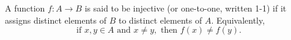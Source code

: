 A function $f: A \to B$ is said to be injective (or one-to-one, written 1-1) if it assigns distinct elements of $B$ to distinct elements of $A$. Equivalently,
$$\text{if } x, y \in A \text{ and } x \neq y, \text{ then } f(x) \neq f(y).$$
